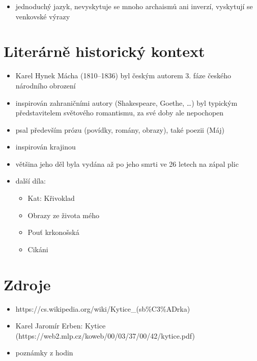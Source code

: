 \documentclass[10pt,a4paper]{article}
\begin{document}
	\begin{itemize}
	\item jednoduchý jazyk, nevyskytuje se mnoho archaismů ani inverzí, vyskytují se venkovské výrazy
	\end{itemize}

\section*{Literárně historický kontext}
\begin{itemize}
\item Karel Hynek Mácha (1810--1836) byl českým autorem 3. fáze českého národního obrození
\item  inspirován zahraničními autory (Shakespeare, Goethe, \ldots) byl typickým představitelem světového romantismu, za své doby ale nepochopen
\item psal především prózu (povídky, romány, obrazy), také poezii (Máj) 
\item inspirován krajinou
\item většina jeho děl byla vydána až po jeho smrti ve 26 letech na zápal plic
\item další díla:
	\begin{itemize}
	\item Kat: Křivoklad
	\item Obrazy ze života mého
	\item Pouť krkonošská
	\item Cikáni
	\end{itemize}
\end{itemize}
\section*{Zdroje}
\begin{itemize}

\item https://cs.wikipedia.org/wiki/Kytice\_(sb\%C3\%ADrka) \\
\item Karel Jaromír Erben: Kytice (https://web2.mlp.cz/koweb/00/03/37/00/42/kytice.pdf)
\item poznámky z hodin
\end{itemize}
\end{document}
